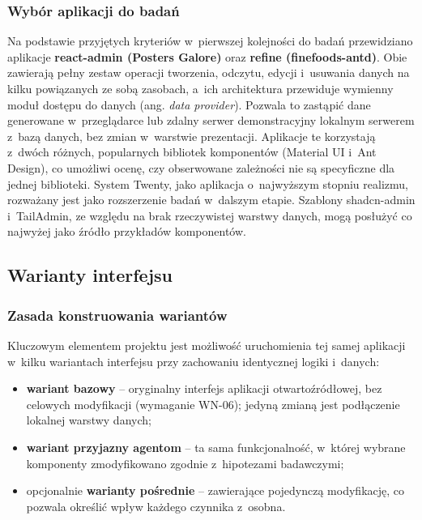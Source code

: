 \subsubsection{Wybór aplikacji do badań}
Na podstawie przyjętych kryteriów w~pierwszej kolejności do badań przewidziano aplikacje \textbf{react-admin (Posters Galore)} oraz \textbf{refine (finefoods-antd)}. Obie zawierają pełny zestaw operacji tworzenia, odczytu, edycji i~usuwania danych na kilku powiązanych ze sobą zasobach, a~ich architektura przewiduje wymienny moduł dostępu do danych (ang. \textit{data provider}). Pozwala to zastąpić dane generowane w~przeglądarce lub zdalny serwer demonstracyjny lokalnym serwerem z~bazą danych, bez zmian w~warstwie prezentacji. Aplikacje te korzystają z~dwóch różnych, popularnych bibliotek komponentów (Material UI i~Ant Design), co umożliwi ocenę, czy obserwowane zależności nie są specyficzne dla jednej biblioteki. System Twenty, jako aplikacja o~najwyższym stopniu realizmu, rozważany jest jako rozszerzenie badań w~dalszym etapie. Szablony shadcn-admin i~TailAdmin, ze względu na brak rzeczywistej warstwy danych, mogą posłużyć co najwyżej jako źródło przykładów komponentów.

\subsection{Warianty interfejsu}
\label{sec:warianty}
\subsubsection{Zasada konstruowania wariantów}
Kluczowym elementem projektu jest możliwość uruchomienia tej samej aplikacji w~kilku wariantach interfejsu przy zachowaniu identycznej logiki i~danych:
\begin{itemize}
    \item \textbf{wariant bazowy} -- oryginalny interfejs aplikacji otwartoźródłowej, bez celowych modyfikacji (wymaganie WN-06); jedyną zmianą jest podłączenie lokalnej warstwy danych;
    \item \textbf{wariant przyjazny agentom} -- ta sama funkcjonalność, w~której wybrane komponenty zmodyfikowano zgodnie z~hipotezami badawczymi;
    \item opcjonalnie \textbf{warianty pośrednie} -- zawierające pojedynczą modyfikację, co pozwala określić wpływ każdego czynnika z~osobna.
\end{itemize}

